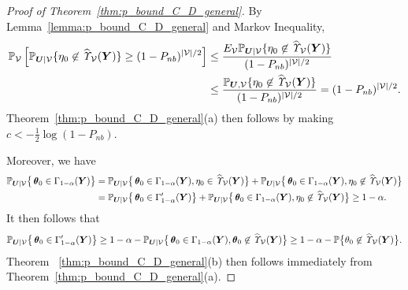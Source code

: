 \documentclass[12pt]{article}
\theoremstyle{shortspace}
\def\*#1{\bm{#1}}
\def\btheta{\mathop{\theta\kern-.45em\hbox{$\theta$}}\nolimits}
\def\P{\mathbb P}
\begin{document}
\begin{proof}[Proof of Theorem~\ref{thm:p_bound_C_D_general}]
	By Lemma~\ref{lemma:p_bound_C_D_general} and Markov Inequality, 
	\begin{align*}
	\P_{\mathcal V}\left[\P_{\*U|\mathcal V}\{\eta_0 \not\in \widehat{\it \Upsilon}_{{\mathcal V}}(\*Y)\} \geq (1-P_{nb})^{|\mathcal V|/2}\right] & \leq \frac{E_{\mathcal V}\P_{\*U|\mathcal V}\{\eta_0 \not\in \widehat{\it \Upsilon}_{{\mathcal V}}(\*Y)\}}{(1-P_{nb})^{|\mathcal V|/2}}\\
	& \leq \frac{\P_{\*U,\mathcal V}\{\eta_0 \not\in \widehat{\it \Upsilon}_{{\mathcal V}}(\*Y)\}}{(1-P_{nb})^{|\mathcal V|/2}} = (1-P_{nb})^{|\mathcal V|/2}.	
	\end{align*}
Theorem~\ref{thm:p_bound_C_D_general}(a) then follows by making $c<-\frac{1}{2}\log(1- P_{nb}).$ 

Moreover, we have
\begin{align*}
   \P_{\*U|\mathcal V}\big\{\btheta_0 \in \Gamma_{1-\alpha}(\*Y)\big\} &  = \P_{\*U|\mathcal V}\big\{\btheta_0 \in \Gamma_{1-\alpha}(\*Y), \eta_0 \in\widehat{\it \Upsilon}_{{\mathcal V}}(\*Y)\big\} +  \P_{\*U|\mathcal V}\big\{\btheta_0 \in \Gamma_{1-\alpha}(\*Y),\eta_0 \not\in\widehat{\it \Upsilon}_{{\mathcal V}}(\*Y)\big\}  \\
   &  = \P_{\*U|\mathcal V}\big\{\btheta_0 \in \Gamma_{1-\alpha}'(\*Y)\big\} +  \P_{\*U|\mathcal V}\big\{\btheta_0 \in \Gamma_{1-\alpha}(\*Y), \eta_0 \not\in\widehat{\it \Upsilon}_{{\mathcal V}}(\*Y)\big\} \geq 1 - \alpha.
\end{align*}
It then follows that
   \begin{align}
   \label{eq:coverage_inequality}
       \P_{\*U|\mathcal V}\big\{\btheta_0 \in \Gamma_{1-\alpha}'(\*Y) \big\} \geq 1- \alpha - \P_{\*U|\mathcal V}\big\{\btheta_0 \in \Gamma_{1-\alpha}(\*Y), \btheta_0 \not\in \widehat{\it \Upsilon}_{{\mathcal V}}(\*Y)\big\} \geq 1- \alpha - \P\big\{\theta_0 \not\in \widehat{\it \Upsilon}_{{\mathcal V}}(\*Y)\big\}.
   \end{align}
Theorem ~\ref{thm:p_bound_C_D_general}(b) then follows immediately from Theorem~\ref{thm:p_bound_C_D_general}(a).
\end{proof}
\end{document}
